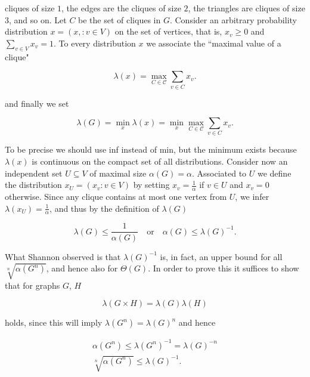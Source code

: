 \documentclass[openany,12pt]{memoir}
\newcommand{\setnewpagemargins}{
    \clearpage
    \setulmarginsandblock{2cm}{0.5cm}{*}
    \checkandfixthelayout
}
\begin{document}
\setnewpagemargins

cliques of size $1$, the edges are the cliques of size $2$, the triangles are cliques 
of size $3$, and so on. Let $C$ be the set of cliques in $G$. Consider an arbitrary 
probability distribution $x = (x, : v \in V)$ on the set of vertices, that 
is, $x_v \geq 0$ and $\sum_{v \in V} x_v = 1$. To every distribution $x$ we associate 
the ``maximal value of a clique"

\begin{equation*}
\lambda(x) = \max_{C \in \mathcal{C}} \sum_{v\in C} x_v.
\end{equation*}

and finally we set

\begin{equation*}
\lambda(G) = \min_x\lambda(x) = \min_x\max_{C \in \mathcal{C}} \sum_{v\in C} x_v.
\end{equation*}

To be precise we should use inf instead of min, but the minimum exists
because $\lambda(x)$ is continuous on the compact set of all distributions.
Consider now an independent set $U \subseteq V$ of maximal size $\alpha(G) = \alpha $.
Associated to $U$ we define the distribution $x_U  = (x_v : v \in V)$ by setting 
$x_v = \frac{1}{\alpha}$ if $v \in U$ and $x_v = 0$ otherwise. Since any clique contains at most 
one vertex from $U$,  we infer $\lambda(x_U) = \frac{1}{\alpha} $, 
and thus by the definition of $\lambda(G)$

\begin{equation*}
\lambda(G) \leq \frac{1}{\alpha(G)} \quad \text{or} \quad \alpha(G) \leq \lambda(G)^{-1}.
\end{equation*}

What Shannon observed is that $\lambda(G)^{-1}$ is, in fact, an upper bound for all 
$\sqrt[n]{\alpha(G^n)}$, and hence also for $\Theta(G)$. In order to prove this it suffices to 
show that for graphs $G$, $H$

\begin{equation}
\lambda(G \times H) = \lambda(G)\lambda(H) \label{one}
\end{equation}

holds, since this will imply $\lambda(G^n) = \lambda(G)^n$ and hence

\begin{equation*}
  \begin{align*}
  \alpha(G^n) \leq \lambda(G^n)^{-1} = \lambda(G)^{-n} \\
  \sqrt[n]{\alpha(G^n)} \leq \lambda(G)^{-1}.
  \end{align*}
\end{equation*}
\end{document}
